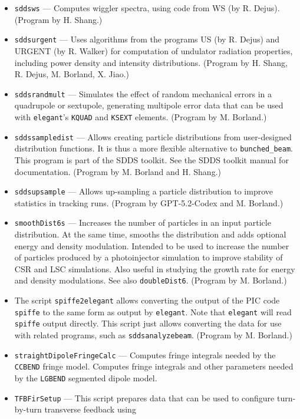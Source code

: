 \documentclass[11pt]{article}
\begin{document}
\begin{itemize}
\item {\tt sddsws} --- Computes wiggler spectra, using code from WS (by R. Dejus).
  (Program by H. Shang.)
\item {\tt sddsurgent} --- Uses algorithms from the programs US (by R. Dejus) and URGENT (by R. Walker) for computation of undulator
  radiation properties, including power density and intensity distributions.  (Program by H. Shang, R. Dejus, M. Borland, X. Jiao.)
\item {\tt sddsrandmult} --- Simulates the effect of random mechanical errors in a quadrupole or sextupole,
  generating multipole error data that can be used with {\tt elegant}'s {\tt KQUAD} and {\tt KSEXT}
  elements. (Program by M. Borland.)
\item {\tt sddssampledist} --- Allows creating particle
        distributions from user-designed distribution functions.  It is thus a more flexible alternative
        to \verb|bunched_beam|.  This program is part of the SDDS toolkit.  See the SDDS toolkit
        manual for documentation.  (Program by M. Borland and H. Shang.)
\item {\tt sddsupsample} --- Allows up-sampling a particle distribution to improve statistics in tracking runs. (Program by GPT-5.2-Codex and M. Borland.)
\item {\tt smoothDist6s} --- Increases the number of particles in an input particle distribution.  At the same
 time, smooths the distribution and adds optional energy and density modulation.   Intended to be used to increase the number of particles
 produced by a photoinjector simulation to improve stability of CSR and LSC simulations.  Also useful in studying 
 the growth rate for energy and density modulations.  See also {\tt doubleDist6}.
  (Program by M. Borland.)
\item The script \verb|spiffe2elegant| allows converting the output of the PIC code \verb|spiffe| to the same form
  as output by \verb|elegant|.  Note that \verb|elegant| will read \verb|spiffe| output directly. This script just allows converting the
  data for use with related programs, such as \verb|sddsanalyzebeam|.
  (Program by M. Borland.)
\item {\tt straightDipoleFringeCalc} --- Computes fringe integrals needed by the \verb|CCBEND| fringe
  model. Computes fringe integrals and other parameters needed by the \verb|LGBEND| segmented dipole model.
\item {\tt TFBFirSetup} --- This script prepares data that can be used to configure turn-by-turn transverse feedback using

\end{itemize}
\end{document}
